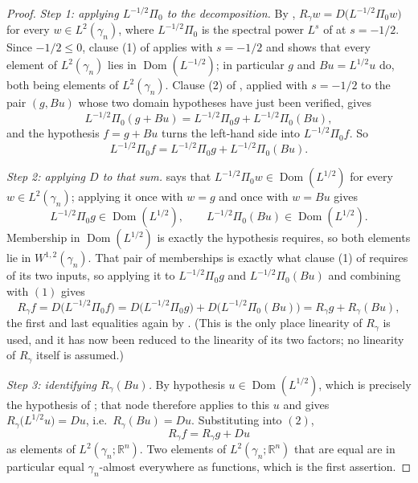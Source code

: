 \begin{proof}
\emph{Step 1: applying $L^{-1/2}\Pi_0$ to the decomposition.}
By , $R_\gamma w = D\bigl(L^{-1/2}\Pi_0 w\bigr)$ for every
$w \in L^2(\gamma_n)$, where $L^{-1/2}\Pi_0$ is the spectral power $L^s$ of
 at $s = -1/2$.  Since $-1/2 \leq 0$, clause (1) of
 applies with $s = -1/2$ and shows that every element of
$L^2(\gamma_n)$ lies in $\operatorname{Dom}(L^{-1/2})$; in particular $g$ and
$Bu = L^{1/2}u$ do, both being elements of $L^2(\gamma_n)$.  Clause (2) of
, applied with $s = -1/2$ to the pair $(g, Bu)$ whose two
domain hypotheses have just been verified, gives
\[
  L^{-1/2}\Pi_0 (g + Bu) = L^{-1/2}\Pi_0 g + L^{-1/2}\Pi_0 (Bu) ,
\]
and the hypothesis $f = g + Bu$ turns the left-hand side into
$L^{-1/2}\Pi_0 f$.  So
\[
  L^{-1/2}\Pi_0 f = L^{-1/2}\Pi_0 g + L^{-1/2}\Pi_0(Bu) .
  \tag{1}
\]

\emph{Step 2: applying $D$ to that sum.}
 says that $L^{-1/2}\Pi_0 w \in \operatorname{Dom}(L^{1/2})$
for every $w \in L^2(\gamma_n)$; applying it once with $w = g$ and once with
$w = Bu$ gives
\[
  L^{-1/2}\Pi_0 g \in \operatorname{Dom}(L^{1/2}),
  \qquad
  L^{-1/2}\Pi_0 (Bu) \in \operatorname{Dom}(L^{1/2}) .
\]
Membership in $\operatorname{Dom}(L^{1/2})$ is exactly the hypothesis
 requires, so both elements lie in
$W^{1,2}(\gamma_n)$.  That pair of memberships is exactly what clause (1) of
 requires of its two inputs, so applying it to
$L^{-1/2}\Pi_0 g$ and $L^{-1/2}\Pi_0 (Bu)$ and combining with $(1)$ gives
\[
  R_\gamma f
    = D\bigl(L^{-1/2}\Pi_0 f\bigr)
    = D\bigl(L^{-1/2}\Pi_0 g\bigr) + D\bigl(L^{-1/2}\Pi_0 (Bu)\bigr)
    = R_\gamma g + R_\gamma (Bu) ,
  \tag{2}
\]
the first and last equalities again by .  (This is the
only place linearity of $R_\gamma$ is used, and it has now been reduced to the
linearity of its two factors; no linearity of $R_\gamma$ itself is assumed.)

\emph{Step 3: identifying $R_\gamma(Bu)$.}
By hypothesis $u \in \operatorname{Dom}(L^{1/2})$, which is precisely the
hypothesis of ; that node therefore applies to this
$u$ and gives $R_\gamma\bigl(L^{1/2}u\bigr) = Du$, i.e.\ $R_\gamma(Bu) = Du$.
Substituting into $(2)$,
\[
  R_\gamma f = R_\gamma g + Du
\]
as elements of $L^2(\gamma_n;\mathbb{R}^n)$.  Two elements of
$L^2(\gamma_n;\mathbb{R}^n)$ that are equal are in particular equal
$\gamma_n$-almost everywhere as functions, which is the first assertion.


\end{proof}
